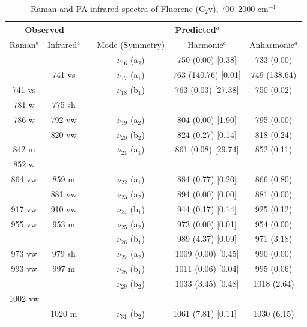 	\begin{table}[H]
		\caption{Raman and PA infrared spectra of Fluorene (C$_{2}$v), 700–2000 cm$^{-1}$}
		\begin{center}
				\begin{tabular}{c c c c c c}
					\hline
					\multicolumn{ 2}{c}{Observed} & \multicolumn{1}{c}{} & \multicolumn{ 3}{c}{Predicted$^{a}$} \\ \hline
					Raman$^{b}$ & \multicolumn{1}{c}{Infrared$^{b}$} &  & \multicolumn{1}{c}{Mode (Symmetry)} & \multicolumn{1}{c}{Harmonic$^{c}$} & Anharmonic$^{d}$ \\ \hline
 &  &  & $\nu_{16}$ (a$_{2}$) & 750 (0.00) [0.38] & 733 (0.00) \\ 
 & 741 vs &  & $\nu_{17}$ (a$_{1}$) & 763 (140.76) [0.01] & 749 (138.64) \\ 
 741 vs &  &  & $\nu_{18}$ (b$_{1}$) & 763 (0.03) [27.38] & 750 (0.02) \\ 
 781 w & 775 sh &  & \multicolumn{1}{l}{        
 } &  &  \\ 
 786 w & 792 vw &  & $\nu_{19}$ (a$_{2}$) & 804 (0.00) [1.90] & 795 (0.00) \\ 
 & 820 vw &  & $\nu_{20}$ (b$_{2}$) & 824 (0.27) [0.14] & 818 (0.24) \\ 
 842 m &  &  & $\nu_{21}$ (a$_{1}$) & 861 (0.08) [29.74] & 852 (0.11) \\ 
 852 w &  &  &  &  &  \\ 
 864 vw & 859 m &  & $\nu_{22}$ (a$_{1}$) & 884 (0.77) [0.20] & 866 (0.80) \\ 
 & 881 vw &  & $\nu_{23}$ (a$_{2}$) & 894 (0.00) [0.00] & 881 (0.00) \\ 
 917 vw & 910 vw &  & $\nu_{24}$ (b$_{1}$) & 944 (0.17) [0.14] & 925 (0.12) \\ 
 955 vw & 953 m &  & $\nu_{25}$ (a$_{2}$) & 973 (0.00) [0.01] & 954 (0.00) \\ 
 &  &  & $\nu_{26}$ (b$_{1}$) & 989 (4.37) [0.09] & 971 (3.18) \\ 
 973 vw & 979 sh &  & $\nu_{27}$ (a$_{2}$) & 1009 (0.00) [0.45] & 990 (0.00) \\ 
 993 vw & 997 m &  & \multicolumn{1}{c}{ $\nu_{28}$ (b$_{1}$)} & 1011 (0.06) [0.04] & 995 (0.06) \\ 
 &  &  & $\nu_{29}$ (b$_{2}$)
 & 1033 (3.45) [0.48] & 1018 (2.64) \\ 
 1002 vw &  &  &  &  &  \\ 
 & 1020 m &  & $\nu_{31}$ (b$_{2}$) & \multicolumn{1}{l}{ 1061 (7.81) [0.11]} & 1030 (6.15) \\ 

\end{tabular}
\end{center}
\end{table}
